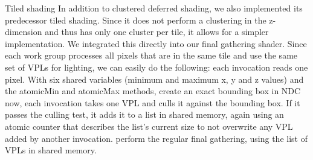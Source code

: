 \begin{outline}
\1 Tiled shading
    \2 In addition to clustered deferred shading, we also implemented its predecessor tiled shading. Since it does not perform a clustering in the z-dimension and thus has only one cluster per tile, it allows for a simpler implementation.
    \2 We integrated this directly into our final gathering shader. Since each work group processes all pixels that are in the same tile and use the same set of VPLs for lighting, we can easily do the following:
        \3 each invocation reads one pixel. With six shared variables (minimum and maximum x, y and z values) and the atomicMin and atomicMax methods, create an exact bounding box in NDC
        \3 now, each invocation takes one VPL and culls it against the bounding box. If it passes the culling test, it adds it to a list in shared memory, again using an atomic counter that describes the list's current size to not overwrite any VPL added by another invocation.
        \3 perform the regular final gathering, using the list of VPLs in shared memory.


\end{outline}
